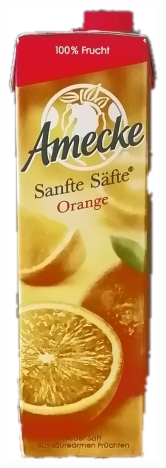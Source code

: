 \begin{appendices}
\begin{figure}[htb]
\begin{minipage}[c]{0.2\textwidth}
\end{minipage}
\hfill
\begin{minipage}[c]{0.08\textwidth}
\includegraphics[width=\textwidth]{Sources/Bild3_HA.png}

\end{minipage}
\end{figure}
\end{appendices}

